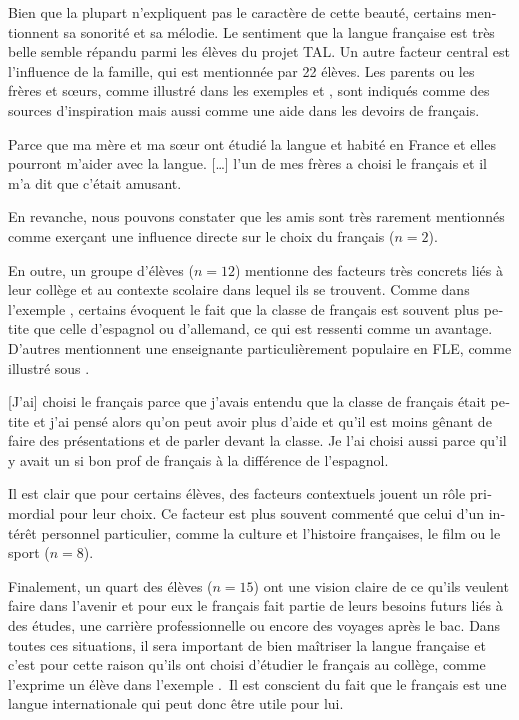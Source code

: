 \documentclass[french, output=paper]{langscibook}
\begin{document}
\begin{otherlanguage}{french}
Bien que la plupart n’expliquent pas le caractère de cette beauté, certains mentionnent sa sonorité et sa mélodie. Le sentiment que la langue française est très belle semble répandu parmi les élèves du projet TAL. Un autre facteur central est l’influence de la famille, qui est mentionnée par 22 élèves. Les parents ou les frères et sœurs, comme illustré dans les exemples  et , sont indiqués comme des sources d’inspiration mais aussi comme une aide dans les devoirs de français.

\ea%
    \label{ex:granfeldt:2}
    Parce que ma mère et ma sœur ont étudié la langue et habité en France et elles pourront m’aider avec la langue.
\ex%
    \label{ex:granfeldt:3}
    {[…]} l’un de mes frères a choisi le français et il m’a dit que c’était amusant.
\z

En revanche, nous pouvons constater que les amis sont très rarement mentionnés comme exerçant une influence directe sur le choix du français ($n=2$).

En outre, un groupe d’élèves ($n=12$) mentionne des facteurs très concrets liés à leur collège et au contexte scolaire dans lequel ils se trouvent. Comme dans l’exemple , certains évoquent le fait que la classe de français est souvent plus petite que celle d’espagnol ou d’allemand, ce qui est ressenti comme un avantage. D’autres mentionnent une enseignante particulièrement populaire en FLE, comme illustré sous . 

\ea%
    \label{ex:granfeldt:4}
    {[J’ai]} choisi le français parce que j’avais entendu que la classe de français était petite et j’ai pensé alors qu’on peut avoir plus d’aide et qu’il est moins gênant de faire des présentations et de parler devant la classe. 
\ex%
    \label{ex:granfeldt:5}
    Je l’ai choisi aussi parce qu’il y avait un si bon prof de français à la différence de l’espagnol. 
\z

Il est clair que pour certains élèves, des facteurs contextuels jouent un rôle primordial pour leur choix. Ce facteur est plus souvent commenté que celui d’un intérêt personnel particulier, comme la culture et l’histoire françaises, le film ou le sport ($n=8$).

Finalement, un quart des élèves ($n=15$) ont une vision claire de ce qu’ils veulent faire dans l’avenir et pour eux le français fait partie de leurs besoins futurs liés à des études, une carrière professionnelle ou encore des voyages après le bac. Dans toutes ces situations, il sera important de bien maîtriser la langue française et c’est pour cette raison qu’ils ont choisi d’étudier le français au collège, comme l’exprime un élève dans l’exemple .~Il est conscient du fait que le français est une langue internationale qui peut donc être utile pour lui.


\end{otherlanguage}
\end{document}
